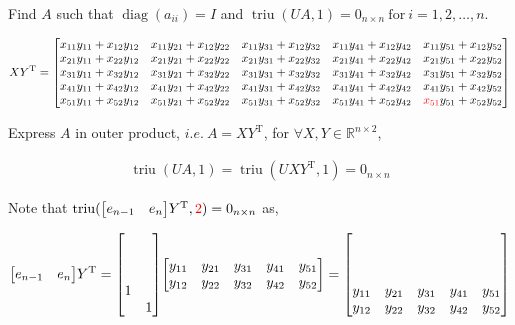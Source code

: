 \documentclass[11pt]{article}
\newcommand{\diag}{\mathop{\mathrm{diag}}}
\newcommand{\triu}{\mathop{\mathrm{triu}}}
\newcommand{\T}{\mathrm{T}}
\newcommand{\redtext}[1]{\textcolor{red}{#1}}
\begin{document}
\noindent Find $A$ such that $\diag(a_{ii}) = I$ and $\triu(UA, 1) = 0_{n \times n}\ \text{for} \ i = 1, 2, \ldots , n$.

\begin{align*}
    XY^{\T} = \mqty[
        x_{11} y_{11} + x_{12} y_{12} & x_{11} y_{21} + x_{12} y_{22} & x_{11} y_{31} + x_{12} y_{32} & x_{11} y_{41} + x_{12} y_{42} & x_{11} y_{51} + x_{12} y_{52}\\
        x_{21} y_{11} + x_{22} y_{12} & x_{21} y_{21} + x_{22} y_{22} & x_{21} y_{31} + x_{22} y_{32} & x_{21} y_{41} + x_{22} y_{42} & x_{21} y_{51} + x_{22} y_{52}\\
        x_{31} y_{11} + x_{32} y_{12} & x_{31} y_{21} + x_{32} y_{22} & x_{31} y_{31} + x_{32} y_{32} & x_{31} y_{41} + x_{32} y_{42} & x_{31} y_{51} + x_{32} y_{52}\\
        x_{41} y_{11} + x_{42} y_{12} & x_{41} y_{21} + x_{42} y_{22} & x_{41} y_{31} + x_{42} y_{32} & x_{41} y_{41} + x_{42} y_{42} & x_{41} y_{51} + x_{42} y_{52}\\
        x_{51} y_{11} + x_{52} y_{12} & x_{51} y_{21} + x_{52} y_{22} & x_{51} y_{31} + x_{52} y_{32} & x_{51} y_{41} + x_{52} y_{42} & \redtext{x_{51}} y_{51} + x_{52} y_{52}
    ]
\end{align*}



\noindent Express $A$ in outer product, $i.e. \ A = XY^{\T}$, for $\forall X,Y \in \mathbb{R}^{n \times 2}$,


\begin{align*}
    \triu(UA, 1) = \triu(UXY^{\T}, 1) = 0_{n \times n}
\end{align*}


\noindent Note that $\triu(\mqty[e_{n-1} & e_{n}] Y^{\T}, \textcolor{red}{2}) = 0_{n \times n}$ as,

\begin{align*}
    \mqty[e_{n-1} & e_{n}] Y^{\T} = \mqty[
          &   \\
          &   \\
          &   \\
        1 &   \\
          & 1 \\
    ]
    \mqty[
        y_{11} & y_{21} & y_{31} & y_{41} & y_{51}\\
        y_{12} & y_{22} & y_{32} & y_{42} & y_{52}
    ]
    = \mqty[
          &   &   &   &  \\
          &   &   &   &  \\
          &   &   &   &  \\
        y_{11} & y_{21} & y_{31} & y_{41} & y_{51}\\
        y_{12} & y_{22} & y_{32} & y_{42} & y_{52}
    ]
\end{align*}
\end{document}
